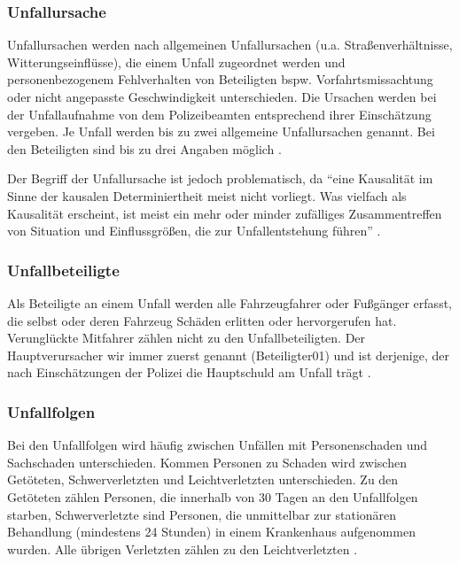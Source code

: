 \subsubsection{Unfallursache}
Unfallursachen werden nach allgemeinen Unfallursachen (u.a. Straßenverhältnisse, Witterungseinflüsse), die einem Unfall zugeordnet werden und personenbezogenem Fehlverhalten von Beteiligten bspw. Vorfahrtsmissachtung oder nicht angepasste Geschwindigkeit unterschieden. Die Ursachen werden bei der Unfallaufnahme von dem Polizeibeamten entsprechend ihrer Einschätzung vergeben. Je Unfall werden bis zu zwei allgemeine Unfallursachen genannt. Bei den Beteiligten sind bis zu drei Angaben möglich \parencite[S. 12]{StatistischesBundesamt.2018b}.

Der Begriff der Unfallursache ist jedoch problematisch, da \enquote{eine Kausalität im Sinne der kausalen Determiniertheit meist nicht vorliegt. Was vielfach als Kausalität erscheint, ist meist ein mehr oder minder zufälliges Zusammentreffen von Situation und Einflussgrößen, die zur Unfallentstehung führen} \parencite[S. 3]{Reichart.2001}.

\subsubsection{Unfallbeteiligte}
Als Beteiligte an einem Unfall werden alle Fahrzeugfahrer oder Fußgänger erfasst, die selbst oder deren Fahrzeug Schäden erlitten oder hervorgerufen hat. Verunglückte Mitfahrer zählen nicht zu den Unfallbeteiligten. Der Hauptverursacher wir immer zuerst genannt (Beteiligter01) und ist derjenige, der nach Einschätzungen der Polizei die Hauptschuld am Unfall trägt \parencite[S. 12]{StatistischesBundesamt.2018b}.

\subsubsection{Unfallfolgen}\label{subsection:Unfallfolgen}
Bei den Unfallfolgen wird häufig zwischen Unfällen mit Personenschaden und Sachschaden unterschieden. Kommen Personen zu Schaden wird zwischen Getöteten, Schwerverletzten und Leichtverletzten unterschieden. Zu den Getöteten zählen Personen, die innerhalb von 30 Tagen an den Unfallfolgen starben, Schwerverletzte sind Personen, die unmittelbar zur stationären Behandlung (mindestens 24 Stunden) in einem Krankenhaus aufgenommen wurden. Alle übrigen Verletzten zählen zu den Leichtverletzten \parencite[S. 12]{StatistischesBundesamt.2018b}.

